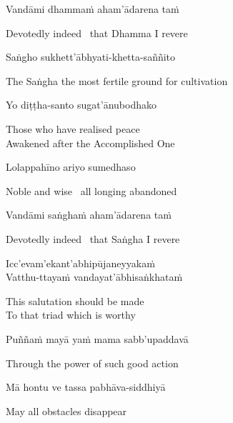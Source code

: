 Vandāmi dhammaṁ aham'ādarena taṁ

\begin{english}
  Devotedly indeed \breathmark\ that Dhamma I revere
\end{english}

Saṅgho sukhett'ābhyati-khetta-saññito

\begin{english}
  The Saṅgha the most fertile ground for cultivation
\end{english}

Yo diṭṭha-santo sugat'ānubodhako

\begin{english}
  Those who have realised peace\\
  Awakened after the Accomplished One
\end{english}

Lolappahīno ariyo sumedhaso

\begin{english}
  Noble and wise \breathmark\ all longing abandoned
\end{english}

Vandāmi saṅghaṁ aham'ādarena taṁ

\begin{english}
  Devotedly indeed \breathmark\ that Saṅgha I revere
\end{english}

Icc'evam'ekant'abhipūjaneyyakaṁ\\
Vatthu-ttayaṁ vandayat'ābhisaṅkhataṁ

\begin{english}
  This salutation should be made\\
  To that triad\makeatletter\hyperlink{endnote11-appendix}\makeatother
  which is worthy
\end{english}

Puññaṁ mayā yaṁ mama sabb'upaddavā

\begin{english}
  Through the power of such good action
\end{english}

Mā hontu ve tassa pabhāva-siddhiyā

\begin{english}
  May all obstacles disappear
\end{english}

